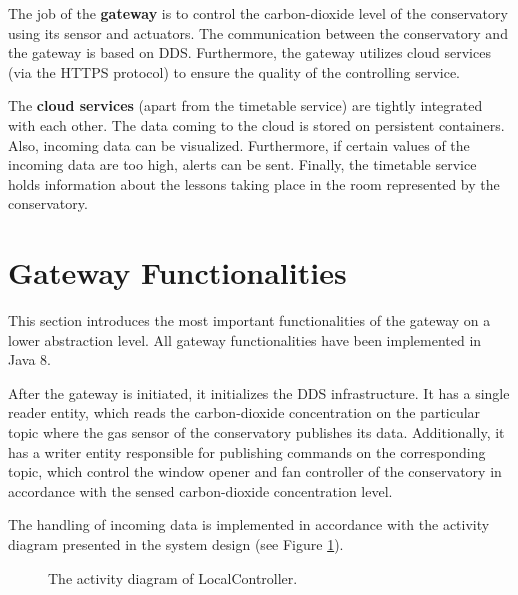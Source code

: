 \documentclass[a4paper, 11pt]{article}
\begin{document}
	The job of the \textbf{gateway} is to control the carbon-dioxide level of the conservatory using its sensor and actuators. The communication between the conservatory and the gateway is based on DDS. Furthermore, the gateway utilizes cloud services (via the HTTPS protocol) to ensure the quality of the controlling service.
	
	The \textbf{cloud services} (apart from the timetable service) are tightly integrated with each other. The data coming to the cloud is stored on persistent containers. Also, incoming data can be visualized. Furthermore, if certain values of the incoming data are too high, alerts can be sent. Finally, the timetable service holds information about the lessons taking place in the room represented by the conservatory.
	
	\section{Gateway Functionalities}
	This section introduces the most important functionalities of the gateway on a lower abstraction level. All gateway functionalities have been implemented in Java 8.
	
	After the gateway is initiated, it initializes the DDS infrastructure. It has a single reader entity, which reads the carbon-dioxide concentration on the particular topic where the gas sensor of the conservatory publishes its data. Additionally, it has a writer entity responsible for publishing commands on the corresponding topic, which control the window opener and fan controller of the conservatory in accordance with the sensed carbon-dioxide concentration level.
	
	The handling of incoming data is implemented in accordance with the activity diagram presented in the system design (see Figure \ref{fig:activity}).
	
	\begin{figure}[h!]
		\center
		\caption{The activity diagram of LocalController.}
		\label{fig:activity}
	\end{figure}
\end{document}
